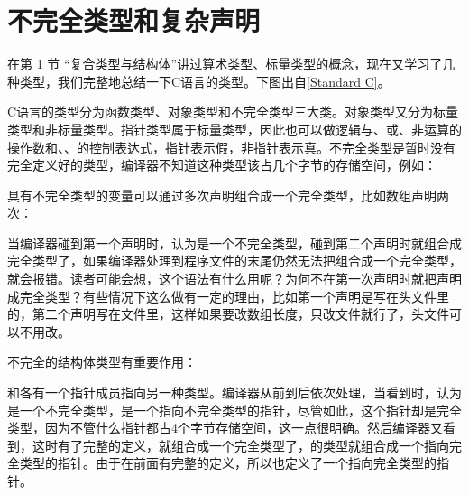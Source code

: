 


\section{不完全类型和复杂声明}
%
在\hyperlink{db.ch07s01.id2730146}{第 1 节 “复合类型与结构体”}讲过算术类型、标量类型的概念，现在又学习了几种类型，我们完整地总结一下C语言的类型。下图出自\hyperlink{db.bi01.bibli.standardc}{[Standard C]}。




C语言的类型分为函数类型、对象类型和不完全类型三大类。对象类型又分为标量类型和非标量类型。指针类型属于标量类型，因此也可以做逻辑与、或、非运算的操作数和、、的控制表达式，指针表示假，非指针表示真。不完全类型是暂时没有完全定义好的类型，编译器不知道这种类型该占几个字节的存储空间，例如：




具有不完全类型的变量可以通过多次声明组合成一个完全类型，比如数组声明两次：




当编译器碰到第一个声明时，认为是一个不完全类型，碰到第二个声明时就组合成完全类型了，如果编译器处理到程序文件的末尾仍然无法把组合成一个完全类型，就会报错。读者可能会想，这个语法有什么用呢？为何不在第一次声明时就把声明成完全类型？有些情况下这么做有一定的理由，比如第一个声明是写在头文件里的，第二个声明写在文件里，这样如果要改数组长度，只改文件就行了，头文件可以不用改。



不完全的结构体类型有重要作用：




和各有一个指针成员指向另一种类型。编译器从前到后依次处理，当看到时，认为是一个不完全类型，是一个指向不完全类型的指针，尽管如此，这个指针却是完全类型，因为不管什么指针都占4个字节存储空间，这一点很明确。然后编译器又看到，这时有了完整的定义，就组合成一个完全类型了，的类型就组合成一个指向完全类型的指针。由于在前面有完整的定义，所以也定义了一个指向完全类型的指针。



